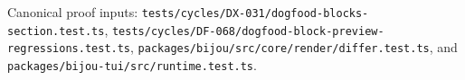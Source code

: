 \begin{itemize}
  Canonical proof inputs: \texttt{t\allowbreak{}e\allowbreak{}s\allowbreak{}t\allowbreak{}s\allowbreak{}/\allowbreak{}c\allowbreak{}y\allowbreak{}c\allowbreak{}l\allowbreak{}e\allowbreak{}s\allowbreak{}/\allowbreak{}D\allowbreak{}X\allowbreak{}-\allowbreak{}0\allowbreak{}3\allowbreak{}1\allowbreak{}/\allowbreak{}d\allowbreak{}o\allowbreak{}g\allowbreak{}f\allowbreak{}o\allowbreak{}o\allowbreak{}d\allowbreak{}-\allowbreak{}b\allowbreak{}l\allowbreak{}o\allowbreak{}c\allowbreak{}k\allowbreak{}s\allowbreak{}-\allowbreak{}s\allowbreak{}e\allowbreak{}c\allowbreak{}t\allowbreak{}i\allowbreak{}o\allowbreak{}n\allowbreak{}.\allowbreak{}t\allowbreak{}e\allowbreak{}s\allowbreak{}t\allowbreak{}.\allowbreak{}t\allowbreak{}s}, \texttt{t\allowbreak{}e\allowbreak{}s\allowbreak{}t\allowbreak{}s\allowbreak{}/\allowbreak{}c\allowbreak{}y\allowbreak{}c\allowbreak{}l\allowbreak{}e\allowbreak{}s\allowbreak{}/\allowbreak{}D\allowbreak{}F\allowbreak{}-\allowbreak{}0\allowbreak{}6\allowbreak{}8\allowbreak{}/\allowbreak{}d\allowbreak{}o\allowbreak{}g\allowbreak{}f\allowbreak{}o\allowbreak{}o\allowbreak{}d\allowbreak{}-\allowbreak{}b\allowbreak{}l\allowbreak{}o\allowbreak{}c\allowbreak{}k\allowbreak{}-\allowbreak{}p\allowbreak{}r\allowbreak{}e\allowbreak{}v\allowbreak{}i\allowbreak{}e\allowbreak{}w\allowbreak{}-\allowbreak{}r\allowbreak{}e\allowbreak{}g\allowbreak{}r\allowbreak{}e\allowbreak{}s\allowbreak{}s\allowbreak{}i\allowbreak{}o\allowbreak{}n\allowbreak{}s\allowbreak{}.\allowbreak{}t\allowbreak{}e\allowbreak{}s\allowbreak{}t\allowbreak{}.\allowbreak{}t\allowbreak{}s}, \texttt{p\allowbreak{}a\allowbreak{}c\allowbreak{}k\allowbreak{}a\allowbreak{}g\allowbreak{}e\allowbreak{}s\allowbreak{}/\allowbreak{}b\allowbreak{}i\allowbreak{}j\allowbreak{}o\allowbreak{}u\allowbreak{}/\allowbreak{}s\allowbreak{}r\allowbreak{}c\allowbreak{}/\allowbreak{}c\allowbreak{}o\allowbreak{}r\allowbreak{}e\allowbreak{}/\allowbreak{}r\allowbreak{}e\allowbreak{}n\allowbreak{}d\allowbreak{}e\allowbreak{}r\allowbreak{}/\allowbreak{}d\allowbreak{}i\allowbreak{}f\allowbreak{}f\allowbreak{}e\allowbreak{}r\allowbreak{}.\allowbreak{}t\allowbreak{}e\allowbreak{}s\allowbreak{}t\allowbreak{}.\allowbreak{}t\allowbreak{}s}, and \texttt{p\allowbreak{}a\allowbreak{}c\allowbreak{}k\allowbreak{}a\allowbreak{}g\allowbreak{}e\allowbreak{}s\allowbreak{}/\allowbreak{}b\allowbreak{}i\allowbreak{}j\allowbreak{}o\allowbreak{}u\allowbreak{}-\allowbreak{}t\allowbreak{}u\allowbreak{}i\allowbreak{}/\allowbreak{}s\allowbreak{}r\allowbreak{}c\allowbreak{}/\allowbreak{}r\allowbreak{}u\allowbreak{}n\allowbreak{}t\allowbreak{}i\allowbreak{}m\allowbreak{}e\allowbreak{}.\allowbreak{}t\allowbreak{}e\allowbreak{}s\allowbreak{}t\allowbreak{}.\allowbreak{}t\allowbreak{}s}.

\end{itemize}
